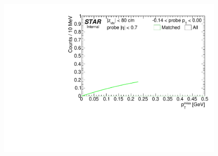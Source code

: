 \begin{figure}[ht]
{  \includegraphics[width=\linewidth,page=8]{graphics/systematicsEfficiency/TOF_tagAndProbe/Fitting_effVsPt_mc.pdf}
}%
\end{figure}
